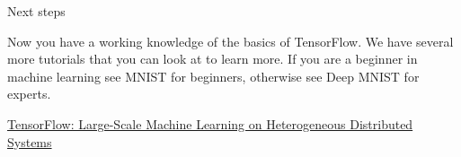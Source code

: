 \documentclass[10pt,a4paper]{ctexbook}
\begin{document}

Next steps

Now you have a working knowledge of the basics of TensorFlow. We have several more tutorials that you can look at to learn more. If you are a beginner in machine learning see MNIST for beginners, otherwise see Deep MNIST for experts.


\href{https://arxiv.org/abs/1603.04467}{TensorFlow: Large-Scale Machine Learning on Heterogeneous Distributed Systems}

\ifx\mlbook\undefined
    
\end{document}
